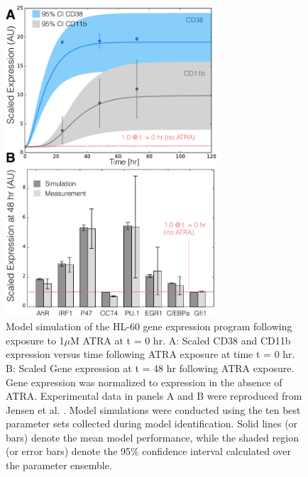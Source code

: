 \documentclass[12pt]{article}
\begin{document}
\begin{figure}[!t]\centering
\includegraphics[width=0.70\textwidth]{./figs/Fig-4-GRN-Simulations.pdf}
\caption{Model simulation of the HL-60 gene expression program following exposure to 1$\mu$M ATRA at t = 0 hr.
A: Scaled CD38 and CD11b expression versus time following ATRA exposure at time t = 0 hr.
B: Scaled Gene expression at t = 48 hr following ATRA exposure.
Gene expression was normalized to expression in the absence of ATRA.
Experimental data in panels A and B were reproduced from Jensen et al. \cite{Jensen:2015aa}.
Model simulations were conducted using the ten best parameter sets collected during model identification.
Solid lines (or bars) denote the mean model performance, while the shaded region (or error bars) denote the 95\% confidence
interval calculated over the parameter ensemble.}\label{fig:model-grn-simulations}
\end{figure}
\end{document}
